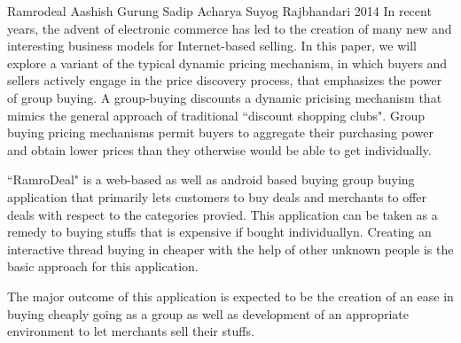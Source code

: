  \begin{conf-abstract}[]
{Ramrodeal}
{
Aashish Gurung
Sadip Acharya
Suyog Rajbhandari
}
{2014}
In recent years, the advent of electronic commerce has led to the creation of 
many new and interesting business models for Internet-based selling. In this
paper, we will explore a variant of the typical dynamic pricing mechanism, in
which buyers and sellers actively engage in the price discovery process, that
emphasizes the power of group buying. A group-buying discounts a dynamic
pricising mechanism that mimics the general approach of traditional ``discount
shopping clubs". Group buying pricing mechanisms permit buyers to aggregate
their purchasing power and obtain lower prices than they otherwise would be
able to get individually.

``RamroDeal" is a web-based as well as android based buying group buying 
application that primarily lets customers to buy deals and merchants to offer
deals with respect to the categories provied. This application can be taken as a
remedy to buying stuffs that is expensive if bought individuallyn. Creating an
interactive thread buying in cheaper with the help of other unknown people is
the basic approach for this application.

The major outcome of this application is expected to be the creation of an ease
in buying cheaply going as a group as well as development of an appropriate
environment to let merchants sell their stuffs.
  \end{conf-abstract}